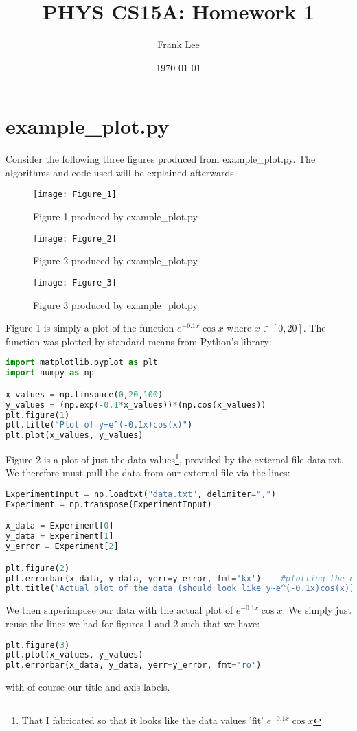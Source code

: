 \documentclass[11pt, oneside]{article}
\title{PHYS CS15A: Homework 1}
\author{Frank Lee}
\date{\today}							%
\begin{document}
\maketitle
\section{example\_plot.py}
Consider the following three figures produced from example\_plot.py. The algorithms and code used will be explained afterwards. 
\begin{figure}[H]
\texttt{[image: Figure\_1]}
\centering
\caption{Figure 1 produced by example\_plot.py}
\end{figure}
\begin{figure}[H]
\texttt{[image: Figure\_2]}
\centering
\caption{Figure 2 produced by example\_plot.py}
\end{figure}
\begin{figure}[H]
\texttt{[image: Figure\_3]}
\centering
\caption{Figure 3 produced by example\_plot.py}
\end{figure}
\noindent
Figure 1 is simply a plot of the function $e^{-0.1x}\cos{x}$ where $x\in[0,20]$. The function was plotted by standard means from Python's  library: 
\begin{lstlisting}[language=Python, caption= Plotting figure 1]
import matplotlib.pyplot as plt
import numpy as np

x_values = np.linspace(0,20,100)
y_values = (np.exp(-0.1*x_values))*(np.cos(x_values))  								
plt.figure(1) 	
plt.title("Plot of y=e^(-0.1x)cos(x)")						
plt.plot(x_values, y_values) 							
\end{lstlisting}

\noindent
Figure 2 is a plot of just the data values\footnote{That I fabricated so that it looks like the data values 'fit' $e^{-0.1x}\cos{x}$}, provided by the external file data.txt. We therefore must pull the data from our external file via the lines:
\begin{lstlisting}[language=Python, caption=Plotting figure 2]
ExperimentInput = np.loadtxt("data.txt", delimiter=",")	
Experiment = np.transpose(ExperimentInput)

x_data = Experiment[0]									
y_data = Experiment[1]
y_error = Experiment[2]	

plt.figure(2)											
plt.errorbar(x_data, y_data, yerr=y_error, fmt='kx')	#plotting the data points
plt.title("Actual plot of the data (should look like y~e^(-0.1x)cos(x))")				
\end{lstlisting}
\noindent
We then superimpose our data with the actual plot of $e^{-0.1x}\cos{x}$. We simply just reuse the lines we had for figures 1 and 2 such that we have: 
\begin{lstlisting}[language=Python, caption=Plotting figure 2]
plt.figure(3)
plt.plot(x_values, y_values) 							
plt.errorbar(x_data, y_data, yerr=y_error, fmt='ro')			
\end{lstlisting}
with of course our title and axis labels. 
\newpage
\end{document}
